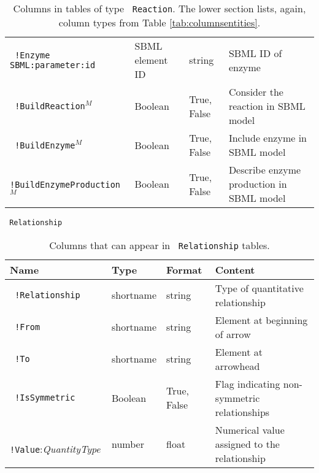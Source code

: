\documentclass[a4paper]{article}
\newcommand{\tab}[1]{{\texttt{\color{red} #1}}}
\newcommand{\col}[1]{\texttt{\color{blue} #1}}
\begin{document}
\begin{appendix}
\begin{table}
\begin{tabular}{|l|l|l|l|}
  \col{!Enzyme SBML:parameter:id}    	& SBML element  ID &string & SBML ID of enzyme   \\
  \col{!BuildReaction}$^{M}$         	& Boolean &  True, False &  Consider the reaction in SBML model\\
  \col{!BuildEnzyme}$^{M}$           	& Boolean &  True, False & Include enzyme  in SBML model\\
  \col{!BuildEnzymeProduction}$^{M}$ 	& Boolean &  True, False & Describe enzyme production in SBML model\\
  \hline
\end{tabular}

\caption{Columns in tables of type \tab{Reaction}.  The lower section lists, again,  column types from Table \ref{tab:columnsentities}.}
\label{tab:columnsreactions}
\end{table}

\begin{table}
  \tab{Relationship} \\
\begin{tabular}{|l|l|l|l|}
  \hline
  Name & Type & Format & Content \\
  \hline
  \col{!Relationship}   & shortname & string 		& Type of quantitative relationship\\
  \col{!From}  			& shortname & string 		& Element at beginning of arrow \\
  \col{!To}    			& shortname & string 		& Element at arrowhead\\
  \col{!IsSymmetric}    & Boolean 	& True, False 	& Flag indicating non-symmetric relationships \\ 
  \col{!Value}:\emph{QuantityType} & number  & float & Numerical value assigned to the relationship \\ 
  \hline
\end{tabular}
\caption{Columns that can appear in \tab{Relationship} tables.}
\label{tab:columnsrelations}
\end{table}


\end{appendix}
\end{document}
